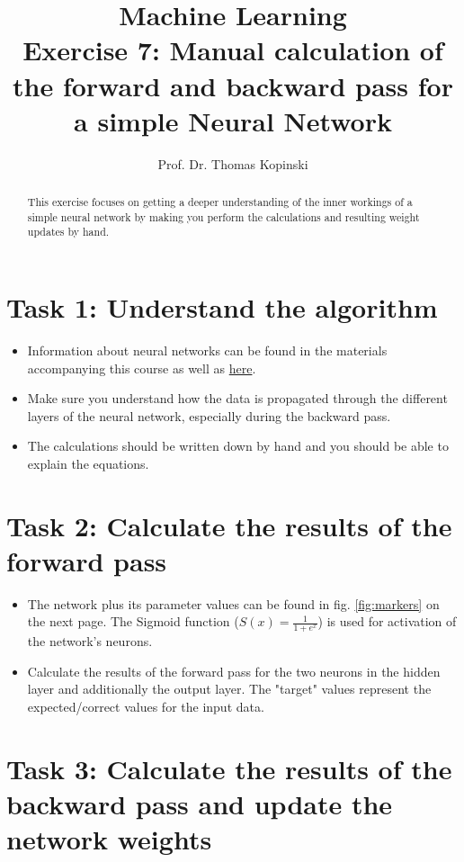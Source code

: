 \documentclass{article}
\title{Machine Learning \\ Exercise 7: Manual calculation of the forward and backward pass for a simple Neural Network}
\author{Prof. Dr. Thomas Kopinski}
\begin{document}
\maketitle

\begin{abstract}
This exercise focuses on getting a deeper understanding of the inner workings of a simple neural network by making you perform the calculations and resulting weight updates by hand.
\end{abstract}

\section*{Task 1: Understand the algorithm}

\begin{itemize}
    \item Information about neural networks can be found in the materials accompanying this course as well as  \href{https://github.com/DataScienceLabFHSWF/machine-learning-book/blob/main/notebooks/ch09/ch09.ipynb}{here}.
    \item Make sure you understand how the data is propagated through the different layers of the neural network, especially during the backward pass.
    \item The calculations should be written down by hand and you should be able to explain the equations.
\end{itemize}

\section*{Task 2: Calculate the results of the forward pass}

\begin{itemize}
    \item The network plus its parameter values can be found in fig. \ref{fig:markers} on the next page. The Sigmoid function ($S(x) = \frac{1}{1+e^x}$) is used for activation of the network's neurons.
    \item Calculate the results of the forward pass for the two neurons in the hidden layer and additionally the output layer. The "target" values represent the expected/correct values for the input data.
\end{itemize}

\section*{Task 3: Calculate the results of the backward pass and update the network weights}
\end{document}
